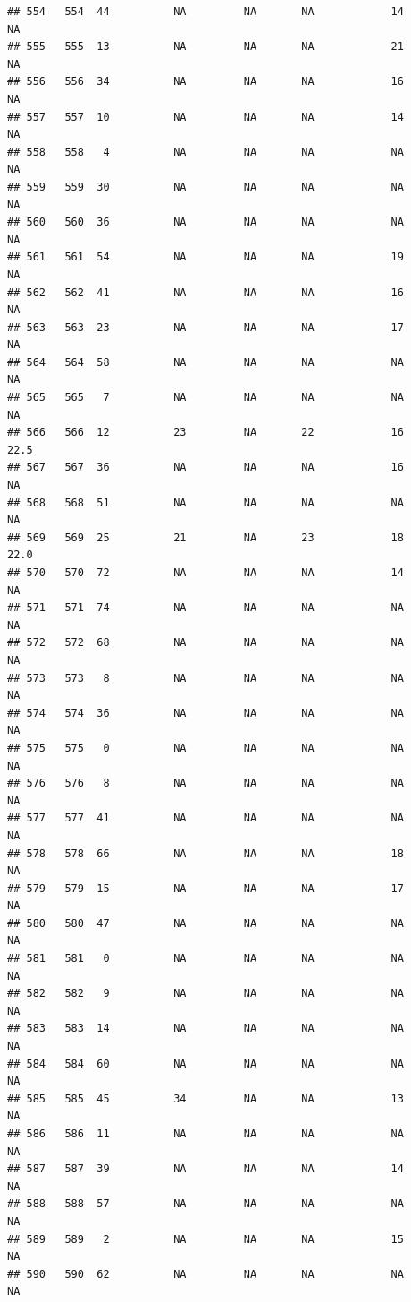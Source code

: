 \documentclass[man]{apa6}
\begin{document}
\begin{verbatim}
## 554   554  44          NA         NA       NA            14       NA
## 555   555  13          NA         NA       NA            21       NA
## 556   556  34          NA         NA       NA            16       NA
## 557   557  10          NA         NA       NA            14       NA
## 558   558   4          NA         NA       NA            NA       NA
## 559   559  30          NA         NA       NA            NA       NA
## 560   560  36          NA         NA       NA            NA       NA
## 561   561  54          NA         NA       NA            19       NA
## 562   562  41          NA         NA       NA            16       NA
## 563   563  23          NA         NA       NA            17       NA
## 564   564  58          NA         NA       NA            NA       NA
## 565   565   7          NA         NA       NA            NA       NA
## 566   566  12          23         NA       22            16     22.5
## 567   567  36          NA         NA       NA            16       NA
## 568   568  51          NA         NA       NA            NA       NA
## 569   569  25          21         NA       23            18     22.0
## 570   570  72          NA         NA       NA            14       NA
## 571   571  74          NA         NA       NA            NA       NA
## 572   572  68          NA         NA       NA            NA       NA
## 573   573   8          NA         NA       NA            NA       NA
## 574   574  36          NA         NA       NA            NA       NA
## 575   575   0          NA         NA       NA            NA       NA
## 576   576   8          NA         NA       NA            NA       NA
## 577   577  41          NA         NA       NA            NA       NA
## 578   578  66          NA         NA       NA            18       NA
## 579   579  15          NA         NA       NA            17       NA
## 580   580  47          NA         NA       NA            NA       NA
## 581   581   0          NA         NA       NA            NA       NA
## 582   582   9          NA         NA       NA            NA       NA
## 583   583  14          NA         NA       NA            NA       NA
## 584   584  60          NA         NA       NA            NA       NA
## 585   585  45          34         NA       NA            13       NA
## 586   586  11          NA         NA       NA            NA       NA
## 587   587  39          NA         NA       NA            14       NA
## 588   588  57          NA         NA       NA            NA       NA
## 589   589   2          NA         NA       NA            15       NA
## 590   590  62          NA         NA       NA            NA       NA

\end{verbatim}
\end{document}
